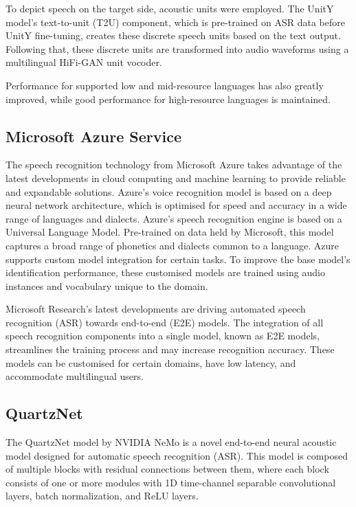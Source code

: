 \documentclass[conference]{IEEEtran}
\begin{document}
To depict speech on the target side, acoustic units were employed. The UnitY model's text-to-unit (T2U) component, which is pre-trained on ASR data before UnitY fine-tuning, creates these discrete speech units based on the text output. Following that, these discrete units are transformed into audio waveforms using a multilingual HiFi-GAN unit vocoder.

Performance for supported low and mid-resource languages has also greatly improved, while good performance for high-resource languages is maintained. \cite{barrault2023}

\subsection{Microsoft Azure Service}

\quad \quad The speech recognition technology from Microsoft Azure takes advantage of the latest developments in cloud computing and machine learning to provide reliable and expandable solutions.
Azure's voice recognition model is based on a deep neural network architecture, which is optimised for speed and accuracy in a wide range of languages and dialects. Azure's speech recognition engine is based on a Universal Language Model. Pre-trained on data held by Microsoft, this model captures a broad range of phonetics and dialects common to a language. Azure supports custom model integration for certain tasks. To improve the base model's identification performance, these customised models are trained using audio instances and vocabulary unique to the domain. \cite{microsoftnd}

Microsoft Research's latest developments are driving automated speech recognition (ASR) towards end-to-end (E2E) models. The integration of all speech recognition components into a single model, known as E2E models, streamlines the training process and may increase recognition accuracy. These models can be customised for certain domains, have low latency, and accommodate multilingual users. \cite{li2021}

\subsection{QuartzNet}

The QuartzNet model by NVIDIA NeMo\cite{9053889} is a novel end-to-end neural acoustic model designed for automatic speech recognition (ASR). This model is composed of multiple blocks with residual connections between them, where each block consists of one or more modules with 1D time-channel separable convolutional layers, batch normalization, and ReLU layers. 
\end{document}
